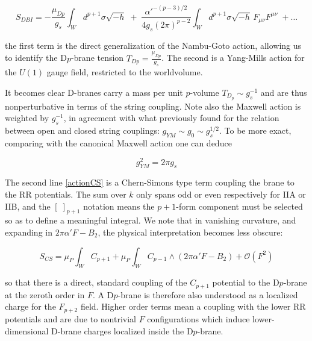 \begin{equation}
	S_{DBI} = -\frac{\mu_{Dp}}{g_s} \int_W d^{p+1} \sigma \sqrt{-h} \; + \; \frac{\alpha'^{-(p-3)/2}}{4 g_s (2\pi)^{p-2} } \int_W d^{p+1} \sigma \sqrt{-h} \, F_{\mu\nu} F^{\mu\nu} \;+  \dots
	\label{DBIexpanded}
\end{equation}

the first term is the direct generalization of the Nambu-Goto action, allowing us to identify the D$p$-brane tension $T_{Dp} = \frac{\mu_{Dp}}{g_s}$. The second is a Yang-Mills action for the $U(1)$ gauge field, restricted to the worldvolume.

It becomes clear D-branes carry a mass per unit $p$-volume $T_{D_p} \sim g_s^{-1}$ and are thus nonperturbative in terms of the string coupling. Note also the Maxwell action is weighted by $g_s^{-1}$, in agreement with what previously found for the relation between open and closed string couplings: $g_{YM} \sim g_0 \sim g_s^{1/2}$. To be more exact, comparing with the canonical Maxwell action one can deduce

\begin{equation}
	g_{YM}^2 = 2\pi g_s
	\label{gymgs}
\end{equation}

The second line \eqref{actionCS} is a Chern-Simons type term coupling the brane to the RR potentials. The sum over $k$ only spans odd or even respectively for IIA or IIB, and the $\left[ \; \right]_{p+1}$ notation means the $p+1$-form component must be selected so as to define a meaningful integral. We note that in vanishing curvature, and expanding in $2\pi\alpha'F-B_2$, the physical interpretation becomes less obscure:

\begin{equation}
	S_{CS} = \mu_P \int_W C_{p+1} + \mu_P \int_W C_{p-1} \wedge (2\pi\alpha'F - B_2) + \mathcal{O}(F^2)\label{} \end{equation}

so that there is a direct, standard coupling of the $C_{p+1}$ potential to the D$p$-brane at the zeroth order in $F$. A D$p$-brane is therefore also understood as a localized charge for the $F_{p+2}$ field. Higher order terms mean a coupling with the lower RR potentials and are due to nontrivial $F$ configurations which induce lower-dimensional D-brane charges localized inside the D$p$-brane.


